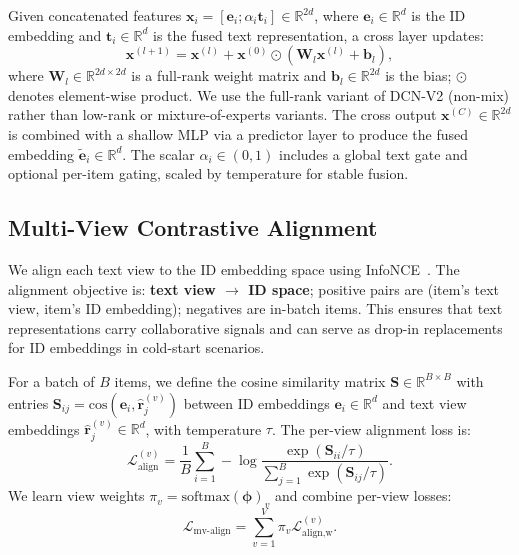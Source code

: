 \documentclass[sigconf,natbib=true]{acmart}
\newcommand{\InfoNCE}{InfoNCE\xspace}
\begin{document}
Given concatenated features
$\mathbf{x}_i=[\mathbf{e}_i;\alpha_i \mathbf{t}_i] \in \mathbb{R}^{2d}$, where
$\mathbf{e}_i \in \mathbb{R}^d$ is the ID embedding and $\mathbf{t}_i \in \mathbb{R}^d$ is the
fused text representation, a cross layer updates:
\begin{equation}
  \mathbf{x}^{(l+1)} = \mathbf{x}^{(l)} + \mathbf{x}^{(0)} \odot (\mathbf{W}_l\mathbf{x}^{(l)} + \mathbf{b}_l),
\end{equation}
where $\mathbf{W}_l \in \mathbb{R}^{2d \times 2d}$ is a
full-rank weight matrix and $\mathbf{b}_l \in \mathbb{R}^{2d}$ is the bias;
$\odot$ denotes element-wise product. We use the full-rank variant of DCN-V2 (non-mix)
rather than low-rank or mixture-of-experts variants. The
cross output $\mathbf{x}^{(C)} \in \mathbb{R}^{2d}$ is combined with a shallow MLP via a predictor
layer to produce the fused embedding $\tilde{\mathbf{e}}_i \in \mathbb{R}^d$.
The scalar $\alpha_i \in (0,1)$ includes a global text gate and
optional per-item gating, scaled by temperature for stable
fusion.

\subsection{Multi-View Contrastive Alignment}
We align each text view to the ID embedding space using
\InfoNCE~\cite{oord2018cpc}. The alignment objective is:
\textbf{text view $\to$ ID space}; positive pairs are
(item's text view, item's ID embedding); negatives are
in-batch items. This ensures that text representations
carry collaborative signals and can serve as drop-in
replacements for ID embeddings in cold-start scenarios.

For a batch of $B$ items, we define
the cosine similarity matrix
$\mathbf{S} \in \mathbb{R}^{B \times B}$ with entries
$\mathbf{S}_{ij} = \mathrm{cos}(\mathbf{e}_{i},
\hat{\mathbf{r}}_{j}^{(v)})$ between ID embeddings
$\mathbf{e}_i \in \mathbb{R}^d$ and text view embeddings
$\hat{\mathbf{r}}_j^{(v)} \in \mathbb{R}^d$, with temperature $\tau$.
The per-view alignment loss is:
\begin{equation}
  \mathcal{L}_{\text{align}}^{(v)} =
  \frac{1}{B}\sum_{i=1}^{B}
  -\log \frac{\exp(\mathbf{S}_{ii}/\tau)}{\sum_{j=1}^{B}\exp(\mathbf{S}_{ij}/\tau)}.
\end{equation}
We learn view weights $\pi_v=\mathrm{softmax}(\boldsymbol{\phi})_v$
and combine per-view losses:
\begin{equation}
  \mathcal{L}_{\text{mv-align}} = \sum_{v=1}^{V}\pi_v \mathcal{L}_{\text{align,w}}^{(v)}.
\end{equation}
\end{document}
